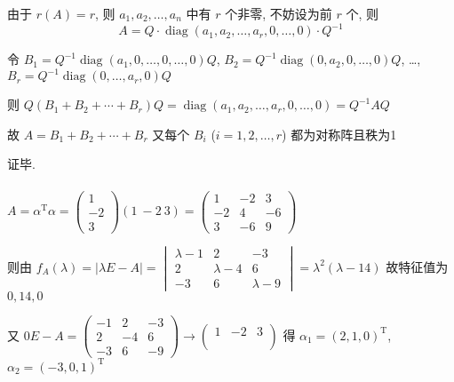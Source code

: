          由于 \( r(A) = r \), 则 \( a_{1}, a_{2}, \dots, a_{n} \) 中有 \( r \) 个非零, 不妨设为前 \( r \) 个, 则
         \[ A = Q \cdot \operatorname{diag}(a_{1}, a_{2}, \dots, a_{r}, 0, \dots, 0) \cdot Q^{-1} \]

         令 \( B_{1} = Q^{-1}\operatorname{diag}(a_{1}, 0, \dots, 0, \dots, 0)Q \), \( B_{2} = Q^{-1}\operatorname{diag}(0, a_{2}, 0, \dots, 0)Q \), \dots, \( B_{r} = Q^{-1}\operatorname{diag}(0, \dots, a_{r}, 0)Q \)

         则 \( Q(B_{1} + B_{2} + \cdots + B_{r})Q = \operatorname{diag}(a_{1}, a_{2}, \dots, a_{r}, 0, \dots, 0) = Q^{-1}AQ \)

         故 \( A = B_{1} + B_{2} + \cdots + B_{r} \) 又每个 \( B_{i} \) (\( i=1,2,\dots,r \)) 都为对称阵且秩为1

         证毕.


     \paragraph{} %
         \( A = \alpha^{\mathrm{T}}\alpha = \begin{pmatrix}
             1  \\
             -2 \\
             3
         \end{pmatrix}(1\ -2\ 3) = \begin{pmatrix}
             1  & -2 & 3  \\
             -2 & 4  & -6 \\
             3  & -6 & 9
         \end{pmatrix} \)

         则由 \( f_{A}(\lambda) = |\lambda E - A| = \begin{vmatrix}
             \lambda-1 & 2         & -3        \\
             2         & \lambda-4 & 6         \\
             -3        & 6         & \lambda-9
         \end{vmatrix} = \lambda^{2}(\lambda-14) \) 故特征值为 \( 0, 14, 0 \)

         又 \( 0E-A = \begin{pmatrix}
             -1 & 2  & -3 \\
             2  & -4 & 6  \\
             -3 & 6  & -9
         \end{pmatrix} \rightarrow \begin{pmatrix}
             1 & -2 & 3 \\
               &    &   \\
               &    &
         \end{pmatrix} \) 得 \( \alpha_{1} = (2, 1, 0)^{\mathrm{T}} \), \( \alpha_{2} = (-3, 0, 1)^{\mathrm{T}} \)

